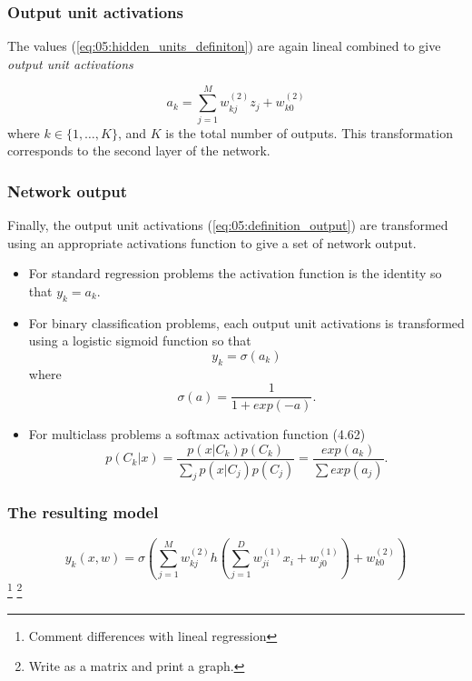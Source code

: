 \begin{frame}
  \frametitle{Output unit activations}

  The values (\ref{eq:05:hidden_units_definiton})
are again lineal combined to give 
\textit{output unit activations}

\begin{equation} \label{eq:05:definition_output}
  a_k 
  = 
  \sum_{j = 1}^M 
  w_{k j}^{(2)} z_j
  +
  w_{k 0}^{(2)}
\end{equation}
where $k \in \{1, \ldots, K\}$, and $K$ is the total number of outputs.
This transformation corresponds to the second layer of the network. 
\end{frame}

\begin{frame}
  \frametitle{Network output}
  Finally, the output unit activations (\ref{eq:05:definition_output}) 
  are transformed using an appropriate activations function to give 
  a set of network output. 
  
  \begin{itemize}
    \item For standard regression problems the activation function is the identity so that $y_k = a_k$. 
    \item For binary classification problems, each output unit activations is transformed using a logistic sigmoid function so that 
    \begin{equation}
      y_k = \sigma(a_k)
    \end{equation}
    where 
    \begin{equation}
      \sigma(a)
      = 
      \frac{1}{1  + exp(-a)}.
    \end{equation}

    \item For multiclass problems a softmax activation function (4.62)
    \begin{equation}
      p(C_k | x)
      = 
      \frac{p(x|C_k) p(C_k)}{\sum_j p(x|C_j)p(C_j)}
      = 
      \frac{exp(a_k)}{\sum{exp(a_j)}}.
    \end{equation}
  \end{itemize}
\end{frame}

\begin{frame}
  \frametitle{The resulting model}

  \begin{equation}
    y_k(x, w)
    = 
    \sigma
    \left(
    \sum_{j = 1}^M
      w_{k j}^{(2)}
      h 
      \left(
        \sum_{j = 1}^D
          w_{j i}^{(1)} x_i
          +
          w_{j 0}^{(1)}
      \right)
      +
      w_{k 0}^{(2)}
    \right) 
  \end{equation}
\footnote{ Comment differences with lineal regression}
 \footnote{Write as a matrix and print a graph.}
\end{frame}

